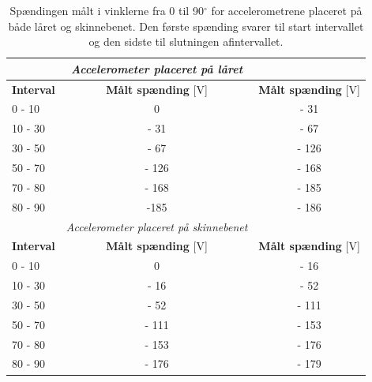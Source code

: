 \begin{table}[H]
\centering
\begin{tabular}{|l|c|c|} \hline
         & \textit{Accelerometer placeret på låret}                           & \multicolumn{1}{|l|}{}                      \\ \hline
\textbf{Interval} & \textbf{Målt spænding} {[}V{]}                                              & \multicolumn{1}{|l|}{\textbf{Målt spænding} {[}V{]}} \\ \hline
0 - 10   & 0                                                                  & - 31                                      \\ \hline
10 - 30  & - 31                                                               & - 67                                      \\ \hline
30 - 50  & - 67                                                               & - 126                                     \\ \hline
50 - 70  & - 126                                                              & - 168                                     \\ \hline
70 - 80  & - 168                                                              & - 185                                     \\
\hline
80 - 90  & -185                                                               & - 186                                     \\
\hline
         & \multicolumn{1}{|l|}{\textit{Accelerometer placeret på skinnebenet}} & \multicolumn{1}{l}{}                      \\ \hline
\textbf{Interval} & \textbf{Målt spænding} {[}V{]}                                              & \multicolumn{1}{|l|}{\textbf{Målt spænding} {[}V{]}} \\ \hline
0 - 10   & 0                                                                  & - 16                                      \\
\hline
10 - 30  & - 16                                                               & - 52                                      \\
\hline
30 - 50  & - 52                                                               & - 111                                     \\
\hline
50 - 70  & - 111                                                              & - 153                                     \\
\hline
70 - 80  & - 153                                                              & - 176                                     \\
\hline
80 - 90  & - 176                                                              & - 179    \\ \hline 
\end{tabular}
\caption{Spændingen målt i vinklerne fra 0 til 90$^{\circ}$ for accelerometrene placeret på både låret og skinnebenet. Den første spænding svarer til start intervallet og den sidste til slutningen afintervallet.}
\label{tab:vinkelinterval_psoc}        
\end{table}

